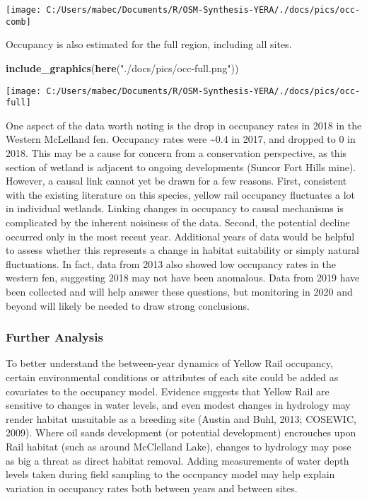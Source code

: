 \documentclass[11pt,]{article}
\newenvironment{Shaded}{\begin{snugshade}}{\end{snugshade}}
\newcommand{\KeywordTok}[1]{\textcolor[rgb]{0.13,0.29,0.53}{\textbf{#1}}}
\newcommand{\StringTok}[1]{\textcolor[rgb]{0.31,0.60,0.02}{#1}}
\newcommand{\NormalTok}[1]{#1}
\begin{document}
\begin{center}\texttt{[image: C:/Users/mabec/Documents/R/OSM-Synthesis-YERA/./docs/pics/occ-comb]} \end{center}

Occupancy is also estimated for the full region, including all sites.

\begin{Shaded}
\begin{Highlighting}[]
\KeywordTok{include_graphics}\NormalTok{(}\KeywordTok{here}\NormalTok{(}\StringTok{"./docs/pics/occ-full.png"}\NormalTok{))}
\end{Highlighting}
\end{Shaded}

\begin{center}\texttt{[image: C:/Users/mabec/Documents/R/OSM-Synthesis-YERA/./docs/pics/occ-full]} \end{center}

One aspect of the data worth noting is the drop in occupancy rates in
2018 in the Western McLelland fen. Occupancy rates were
\textasciitilde{}0.4 in 2017, and dropped to 0 in 2018. This may be a
cause for concern from a conservation perspective, as this section of
wetland is adjacent to ongoing developments (Suncor Fort Hills mine).
However, a causal link cannot yet be drawn for a few reasons. First,
consistent with the existing literature on this species, yellow rail
occupancy fluctuates a lot in individual wetlands. Linking changes in
occupancy to causal mechanisms is complicated by the inherent noisiness
of the data. Second, the potential decline occurred only in the most
recent year. Additional years of data would be helpful to assess whether
this represents a change in habitat suitability or simply natural
fluctuations. In fact, data from 2013 also showed low occupancy rates in
the western fen, suggesting 2018 may not have been anomalous. Data from
2019 have been collected and will help answer these questions, but
monitoring in 2020 and beyond will likely be needed to draw strong
conclusions.

\subsubsection{Further Analysis}\label{further-analysis}

To better understand the between-year dynamics of Yellow Rail occupancy,
certain environmental conditions or attributes of each site could be
added as covariates to the occupancy model. Evidence suggests that
Yellow Rail are sensitive to changes in water levels, and even modest
changes in hydrology may render habitat unsuitable as a breeding site
(Austin and Buhl, 2013; COSEWIC, 2009). Where oil sands development (or
potential development) encrouches upon Rail habitat (such as around
McClelland Lake), changes to hydrology may pose as big a threat as
direct habitat removal. Adding measurements of water depth levels taken
during field sampling to the occupancy model may help explain variation
in occupancy rates both between years and between sites.
\end{document}
